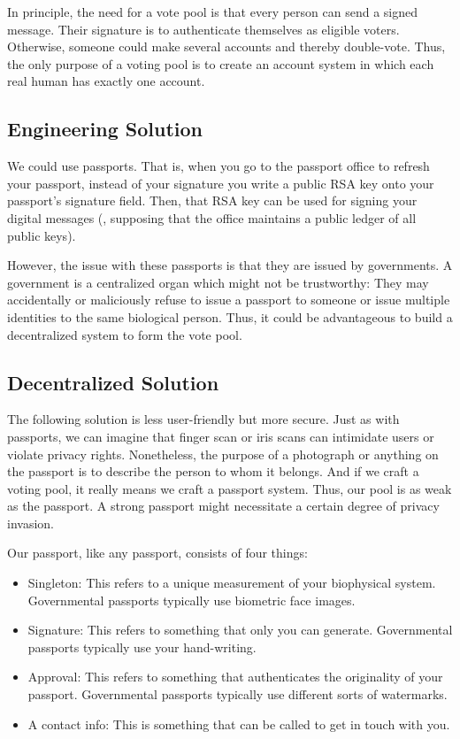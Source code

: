 \documentclass{article}
\theoremstyle{definition}
\begin{document}
	In principle, the need for a vote pool is that every person can send a signed message. Their signature is to authenticate themselves as eligible voters. Otherwise, someone could make several accounts and thereby double-vote.
	Thus, the only purpose of a voting pool is to create an account system in which each real human has exactly one account.
	
	\subsection{Engineering Solution}
	We could use passports. That is, when you go to the passport office to refresh your passport, instead of your signature you write a public RSA key onto your passport's signature field. Then, that RSA key can be used for signing your digital messages (, supposing that the office maintains a public ledger of all public keys).
	
	However, the issue with these passports is that they are issued by governments. A government is a centralized organ which might not be trustworthy: They may accidentally or maliciously refuse to issue a passport to someone or issue multiple identities to the same biological person. Thus, it could be advantageous to build a decentralized system to form the vote pool.
	
	\subsection{Decentralized Solution}
	The following solution is less user-friendly but more secure. Just as with passports, we can imagine that finger scan or iris scans can intimidate users or violate privacy rights. Nonetheless, the purpose of a photograph or anything on the passport is to describe the person to whom it belongs. And if we craft a voting pool, it really means we craft a passport system. Thus, our pool is as weak as the passport. A strong passport might necessitate a certain degree of privacy invasion.
	
	Our passport, like any passport, consists of four things:
	\begin{itemize}
		\item Singleton: This refers to a unique measurement of your biophysical system. Governmental passports typically use biometric face images.
		\item Signature: This refers to something that only you can generate. Governmental passports typically use your hand-writing.
		\item Approval: This refers to something that authenticates the originality of your passport. Governmental passports typically use different sorts of watermarks.
		\item A contact info: This is something that can be called to get in touch with you.
	\end{itemize}
	
\end{document}
